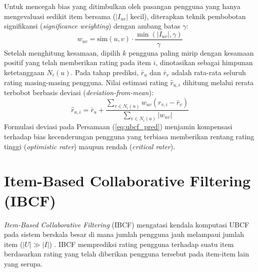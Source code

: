 Untuk mencegah bias yang ditimbulkan oleh pasangan pengguna yang hanya mengevaluasi sedikit item bersama ($|I_{uv}|$ kecil), diterapkan teknik pembobotan signifikansi (\textit{significance weighting}) dengan ambang batas $\gamma$:
\begin{equation}
\label{eq:sig_weight_u}
w_{uv} = \text{sim}(u, v) \cdot \frac{\min(|I_{uv}|, \gamma)}{\gamma}
\end{equation}
Setelah menghitung kesamaan, dipilih $k$ pengguna paling mirip dengan kesamaan positif yang telah memberikan rating pada item $i$, dinotasikan sebagai himpunan ketetanggaan $N_i(u)$. Pada tahap prediksi, $\bar{r}_u$ dan $\bar{r}_v$ adalah rata-rata seluruh rating masing-masing pengguna. Nilai estimasi rating $\hat{r}_{u,i}$ dihitung melalui rerata terbobot berbasis deviasi (\textit{deviation-from-mean}):
\begin{equation}
\label{eq:ubcf_pred}
\hat{r}_{u,i} = \bar{r}_u + \frac{\sum_{v \in N_i(u)} w_{uv} (r_{v,i} - \bar{r}_v)}{\sum_{v \in N_i(u)} |w_{uv}|}
\end{equation}
Formulasi deviasi pada Persamaan (\ref{eq:ubcf_pred}) menjamin kompensasi terhadap bias kecenderungan pengguna yang terbiasa memberikan rentang rating tinggi (\textit{optimistic rater}) maupun rendah (\textit{critical rater}).

\section{Item-Based Collaborative Filtering (IBCF)}
\textit{Item-Based Collaborative Filtering} (IBCF) mengatasi kendala komputasi UBCF pada sistem berskala besar di mana jumlah pengguna jauh melampaui jumlah item ($|U| \gg |I|$) \citep{sarwar2001item}. IBCF memprediksi rating pengguna terhadap suatu item berdasarkan rating yang telah diberikan pengguna tersebut pada item-item lain yang serupa.

